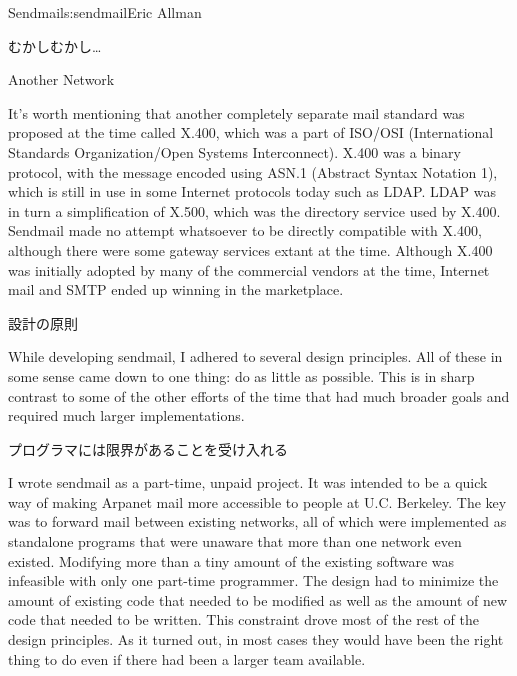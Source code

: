 \begin{aosachapter}{Sendmail}{s:sendmail}{Eric Allman}
\begin{aosasect1}{むかしむかし\ldots}
\begin{aosabox}{Another Network}

It's worth mentioning that another completely separate
mail standard was proposed at the
time called X.400, which was a part of ISO/OSI (International
Standards Organization/Open Systems Interconnect).  X.400 was a binary
protocol, with the message encoded using ASN.1 (Abstract Syntax
Notation 1), which is still in use in some Internet protocols today
such as LDAP\@. LDAP was in turn a simplification of X.500, which was
the directory service used by X.400.  Sendmail made no attempt
whatsoever to be directly compatible with X.400, although there were
some gateway services extant at the time. Although X.400 was initially
adopted by many of the commercial vendors at the time, Internet mail
and SMTP
ended up winning in the marketplace.

\end{aosabox}

\end{aosasect1}

\begin{aosasect1}{設計の原則}

While developing sendmail, I adhered to several design principles. All
of these in some sense came down to one thing: do as little as
possible.  This is in sharp contrast to some of the other efforts of
the time that had much broader goals and required much larger
implementations.

\begin{aosasect2}{プログラマには限界があることを受け入れる}

I wrote sendmail as a part-time, unpaid project. It was intended to be
a quick way of making Arpanet mail more accessible to people at
U.C. Berkeley. The key was to forward mail between existing networks,
all of which were implemented as standalone programs that were unaware
that more than one network even existed. Modifying more than a tiny
amount of the existing software was infeasible with only one part-time
programmer.  The design had to minimize the amount of existing code
that needed to be modified as well as the amount of new code that
needed to be written.  This constraint drove most of the rest of the
design principles. As it turned out, in most cases they would have
been the right thing to do even if there had been a larger team
available.


\end{aosasect2}
\end{aosasect1}
\end{aosachapter}
